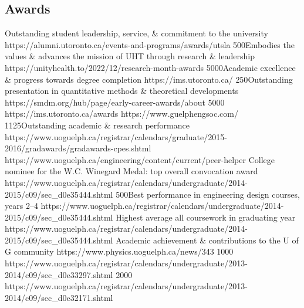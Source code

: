 \subsection{Awards}
  {}{Outstanding student leadership, service, \& commitment to the university}
  {https://alumni.utoronto.ca/events-and-programs/awards/utsla}
  {500}{Embodies the values \& advances the mission of UHT through research \& leadership}
  {https://unityhealth.to/2022/12/research-month-awards}
  {5000}{Academic excellence \& progress towards degree completion}
  {https://ims.utoronto.ca/}
  {250}{Outstanding presentation in quantitative methods \& theoretical developments}
  {https://smdm.org/hub/page/early-career-awards/about}
  {5000}{}
  {https://ims.utoronto.ca/awards}
  {}{}
  {https://www.guelphengsoc.com/}
  {1125}{Outstanding academic \& research performance}
  {https://www.uoguelph.ca/registrar/calendars/graduate/2015-2016/gradawards/gradawards-cpes.shtml}
  {}{}
  {https://www.uoguelph.ca/engineering/content/current/peer-helper}
  {}{College nominee for the W.C. Winegard Medal: top overall convocation award}
  {https://www.uoguelph.ca/registrar/calendars/undergraduate/2014-2015/c09/sec_d0e35444.shtml}
  {500}{Best performance in engineering design courses, years 2--4}
  {https://www.uoguelph.ca/registrar/calendars/undergraduate/2014-2015/c09/sec_d0e35444.shtml}
  {}{Highest average all coursework in graduating year}
  {https://www.uoguelph.ca/registrar/calendars/undergraduate/2014-2015/c09/sec_d0e35444.shtml}
  {}{Academic achievement \& contributions to the U of G community}
  {https://www.physics.uoguelph.ca/news/343}
  {1000}{}
  {https://www.uoguelph.ca/registrar/calendars/undergraduate/2013-2014/c09/sec_d0e33297.shtml}
  {2000}{}
  {https://www.uoguelph.ca/registrar/calendars/undergraduate/2013-2014/c09/sec_d0e32171.shtml}
